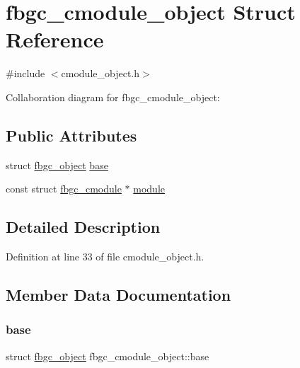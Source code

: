 \hypertarget{structfbgc__cmodule__object}{}\section{fbgc\+\_\+cmodule\+\_\+object Struct Reference}
\label{structfbgc__cmodule__object}


{\ttfamily \#include $<$cmodule\+\_\+object.\+h$>$}



Collaboration diagram for fbgc\+\_\+cmodule\+\_\+object\+:
\subsection*{Public Attributes}
\begin{DoxyCompactItemize}
\item 
struct \hyperlink{structfbgc__object}{fbgc\+\_\+object} \hyperlink{structfbgc__cmodule__object_a2ab1880bbfd260aaac96a1ca6d22578c}{base}
\item 
const struct \hyperlink{structfbgc__cmodule}{fbgc\+\_\+cmodule} $\ast$ \hyperlink{structfbgc__cmodule__object_a452a07b0dfcf04ac22fb76e8f1a2a097}{module}
\end{DoxyCompactItemize}


\subsection{Detailed Description}


Definition at line 33 of file cmodule\+\_\+object.\+h.



\subsection{Member Data Documentation}
\mbox{\label{structfbgc__cmodule__object_a2ab1880bbfd260aaac96a1ca6d22578c}} 
\subsubsection{\texorpdfstring{base}{base}}
{\footnotesize\ttfamily struct \hyperlink{structfbgc__object}{fbgc\+\_\+object} fbgc\+\_\+cmodule\+\_\+object\+::base}



